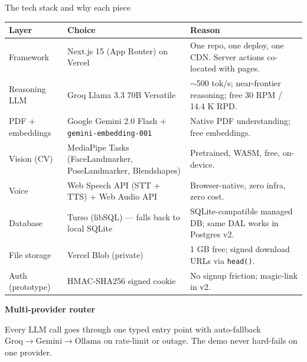 \documentclass[aspectratio=169,10pt]{beamer}
\newcommand{\biglabel}[1]{\textcolor{brand}{\bfseries\large #1}}
\begin{document}
\begin{frame}{The tech stack and why each piece}
  \vspace{0.2cm}
  \footnotesize
  \renewcommand{\arraystretch}{1.4}
  \begin{tabular}{@{}p{3.0cm}p{4.0cm}p{6.8cm}@{}}
    \toprule
    \color{brand}\textbf{Layer} & \color{brand}\textbf{Choice} & \color{brand}\textbf{Reason} \\
    \midrule
    Framework         & Next.js 15 (App Router) on Vercel & One repo, one deploy, one CDN. Server actions co-located with pages. \\
    Reasoning LLM     & Groq \alert{Llama 3.3 70B Versatile} & $\sim$500 tok/s; near-frontier reasoning; free 30 RPM / 14.4 K RPD. \\
    PDF + embeddings  & Google Gemini 2.0 Flash + \texttt{gemini-embedding-001} & Native PDF understanding; free embeddings. \\
    Vision (CV)       & MediaPipe Tasks (FaceLandmarker, PoseLandmarker, Blendshapes) & Pretrained, WASM, free, on-device. \\
    Voice             & Web Speech API (STT + TTS) + Web Audio API & Browser-native, zero infra, zero cost. \\
    Database          & Turso (libSQL) --- falls back to local SQLite & SQLite-compatible managed DB; same DAL works in Postgres v2. \\
    File storage      & Vercel Blob (private) & 1 GB free; signed download URLs via \texttt{head()}. \\
    Auth (prototype)  & HMAC-SHA256 signed cookie & No signup friction; magic-link in v2. \\
    \bottomrule
  \end{tabular}

  \vspace{0.6em}
  \biglabel{Multi-provider router}\par\smallskip
  \footnotesize
  Every LLM call goes through one typed entry point with auto-fallback
  $\text{Groq} \rightarrow \text{Gemini} \rightarrow \text{Ollama}$ on
  rate-limit or outage. The demo never hard-fails on one provider.
\end{frame}
\end{document}

